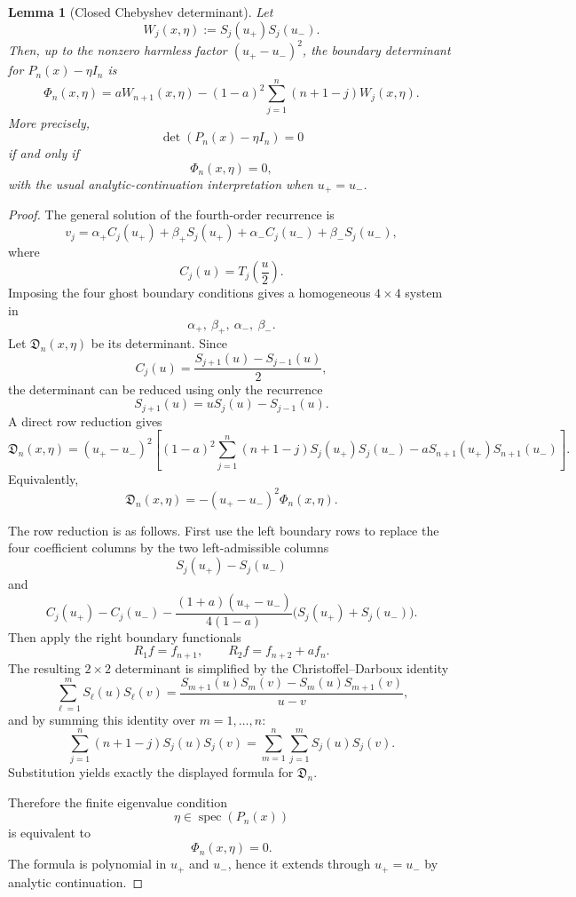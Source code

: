\documentclass[11pt]{amsart}
\numberwithin{equation}{section}
\newtheorem{lemma}[theorem]{Lemma}
\DeclareMathOperator{\spec}{spec}
\begin{document}
\begin{lemma}[Closed Chebyshev determinant]\label{lem:closed-det}
Let
\[
        W_j(x,\eta):=S_j(u_+)S_j(u_-).
\]
Then, up to the nonzero harmless factor \((u_+-u_-)^2\), the boundary
determinant for \(P_n(x)-\eta I_n\) is
\[
        \Phi_n(x,\eta)
        =
        aW_{n+1}(x,\eta)
        -
        (1-a)^2
        \sum_{j=1}^{n}(n+1-j)W_j(x,\eta).
\]
More precisely,
\[
        \det(P_n(x)-\eta I_n)=0
\]
if and only if
\[
        \Phi_n(x,\eta)=0,
\]
with the usual analytic-continuation interpretation when \(u_+=u_-\).
\end{lemma}

\begin{proof}
The general solution of the fourth-order recurrence is
\[
        v_j
        =
        \alpha_+ C_j(u_+)
        +
        \beta_+ S_j(u_+)
        +
        \alpha_- C_j(u_-)
        +
        \beta_- S_j(u_-),
\]
where
\[
        C_j(u)=T_j\!\left(\frac u2\right).
\]
Imposing the four ghost boundary conditions gives a homogeneous \(4\times4\)
system in
\[
        \alpha_+,\ \beta_+,\ \alpha_-,\ \beta_-.
\]
Let \(\mathfrak D_n(x,\eta)\) be its determinant.  Since
\[
        C_j(u)=\frac{S_{j+1}(u)-S_{j-1}(u)}2,
\]
the determinant can be reduced using only the recurrence
\[
        S_{j+1}(u)=uS_j(u)-S_{j-1}(u).
\]
A direct row reduction gives
\[
        \mathfrak D_n(x,\eta)
        =
        (u_+-u_-)^2
        \left[
        (1-a)^2
        \sum_{j=1}^{n}(n+1-j)S_j(u_+)S_j(u_-)
        -
        aS_{n+1}(u_+)S_{n+1}(u_-)
        \right].
\]
Equivalently,
\[
        \mathfrak D_n(x,\eta)
        =
        -(u_+-u_-)^2\Phi_n(x,\eta).
\]

The row reduction is as follows.  First use the left boundary rows to replace
the four coefficient columns by the two left-admissible columns
\[
        S_j(u_+)-S_j(u_-)
\]
and
\[
        C_j(u_+)-C_j(u_-)
        -
        \frac{(1+a)(u_+-u_-)}{4(1-a)}
        \bigl(S_j(u_+)+S_j(u_-)\bigr).
\]
Then apply the right boundary functionals
\[
        R_1 f=f_{n+1},
        \qquad
        R_2 f=f_{n+2}+af_n.
\]
The resulting \(2\times2\) determinant is simplified by the
Christoffel--Darboux identity
\[
        \sum_{\ell=1}^{m}S_\ell(u)S_\ell(v)
        =
        \frac{S_{m+1}(u)S_m(v)-S_m(u)S_{m+1}(v)}{u-v},
\]
and by summing this identity over \(m=1,\dots,n\):
\[
        \sum_{j=1}^{n}(n+1-j)S_j(u)S_j(v)
        =
        \sum_{m=1}^{n}\sum_{j=1}^{m}S_j(u)S_j(v).
\]
Substitution yields exactly the displayed formula for \(\mathfrak D_n\).

Therefore the finite eigenvalue condition
\[
        \eta\in\spec(P_n(x))
\]
is equivalent to
\[
        \Phi_n(x,\eta)=0.
\]
The formula is polynomial in \(u_+\) and \(u_-\), hence it extends through
\(u_+=u_-\) by analytic continuation.
\end{proof}
\end{document}
